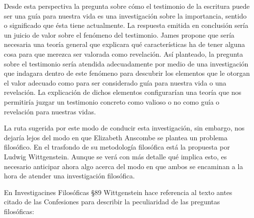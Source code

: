 
Desde esta perspectiva la pregunta sobre cómo el testimonio de la escritura
puede ser una guía para nuestra vida es una investigación sobre la importancia,
sentido o significado que ésta tiene actualmente. La respuesta emitida en
conclusión sería un juicio de valor sobre el fenómeno del testimonio. James
propone que sería necesaria una teoría general que explicara qué características
ha de tener alguna cosa para que merezca ser valorada como revelación. Así
planteado, la pregunta sobre el testimonio sería atendida adecuadamente por
medio de una investigación que indagara dentro de este fenómeno para descubrir
los elementos que le otorgan el valor adecuado como para ser considerado guía
para nuestra vida o una revelación. La explicación de dichos elementos
configurarían una teoría que nos permitiría juzgar un testimonio concreto como
valioso o no como guía o revelación para nuestras vidas.

La ruta sugerida por este modo de conducir esta investigación, sin embargo, nos
dejaría lejos del modo en que Elizabeth Anscombe se plantea un problema
filosófico. En el trasfondo de su metodología filosófica está la propuesta por
Ludwig Wittgenstein. Aunque se verá con más detalle qué implica esto, es
necesario anticipar ahora algo acerca del modo en que ambos se encaminan a la
hora de atender una investigación filosófica.

En Investigacines Filosóficas \S89 Wittgenstein hace referencia al texto antes
citado de las Confesiones para describir la peculiaridad de las preguntas
filosóficas:

